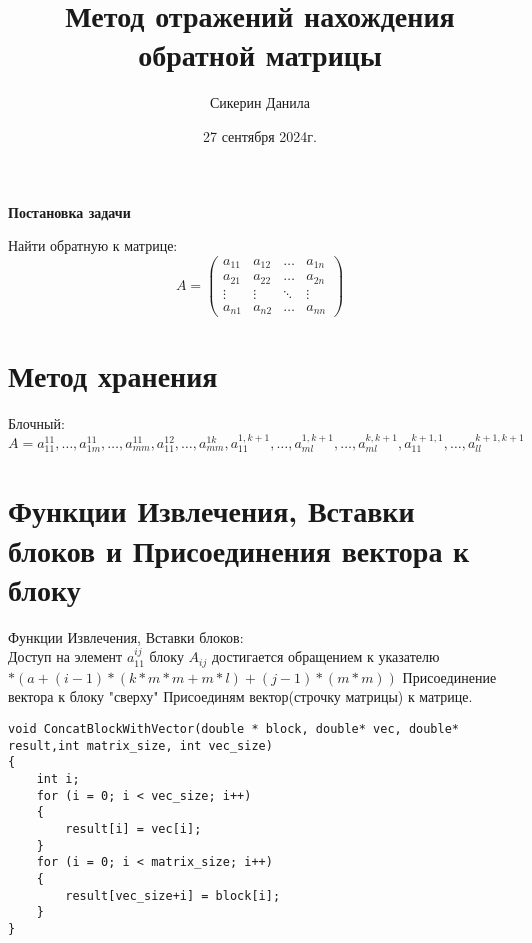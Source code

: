 \documentclass[a4paper,12pt]{article}
\begin{document}
\author{Сикерин Данила}
\title{Метод отражений нахождения обратной матрицы}
\date{27 сентября 2024г.}
\maketitle{}

\begin{center}
{\bfseries Постановка задачи}
\end{center}

Найти обратную к матрице:
$$A=
   \begin{pmatrix}
     a_{11}& a_{12} &\ldots & a_{1n}\\
     a_{21}& a_{22} &\ldots & a_{2n}\\
     \vdots& \vdots &\ddots & \vdots\\
     a_{n1}& a_{n2} &\ldots & a_{nn}
    \end{pmatrix}
$$ 
\section{Метод хранения}
Блочный: $A = a_{11}^{11},\ldots,a_{1m}^{11},\ldots, a_{mm}^{11}, a_{11}^{12},\ldots, a_{mm}^{1k}, a_{11}^{1,k+1},\ldots, a_{ml}^{1,k+1},\ldots, a_{ml}^{k,k+1},a_{11}^{k+1,1}, \ldots, a_{ll}^{k+1,k+1}$
\section{Функции Извлечения, Вставки блоков и Присоединения вектора к блоку}
Функции Извлечения, Вставки блоков:\\
Доступ на элемент $a_{11}^{ij}$ блоку $A_{ij}$ достигается обращением к указателю $*(a+(i-1)*(k*m*m + m*l) + (j-1)*(m*m))$ 
Присоединение вектора к блоку "сверху"
Присоединям вектор(строчку матрицы) к матрице.
\begin{lstlisting}
void ConcatBlockWithVector(double * block, double* vec, double* result,int matrix_size, int vec_size)
{
    int i;
    for (i = 0; i < vec_size; i++)
    {
        result[i] = vec[i];
    }
    for (i = 0; i < matrix_size; i++)
    {
        result[vec_size+i] = block[i];
    }
}
\end{lstlisting}
\end{document}
